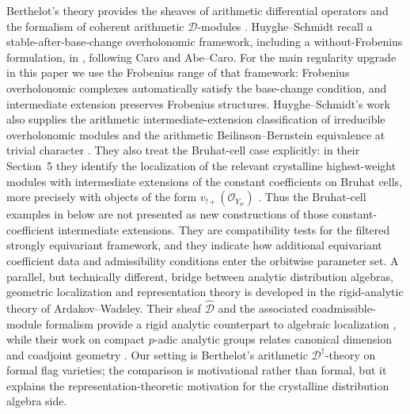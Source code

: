 \documentclass[11pt]{amsart}
\theoremstyle{plain}
\theoremstyle{definition}
\theoremstyle{remark}
\begin{document}
Berthelot's theory provides the sheaves of arithmetic differential operators
and the formalism of coherent arithmetic \(\mathscr D\)-modules
\cite[Sections 2.2 and 3]{BerthelotDModules}.  Huyghe--Schmidt recall a stable-after-base-change overholonomic framework,
including a without-Frobenius formulation, in
\cite[\S2.1, first paragraphs and Definition 2.1.3]{HuygheSchmidtIntermediate}, following Caro and Abe--Caro.
For the main regularity upgrade in this paper we use the Frobenius range of
that framework: Frobenius overholonomic complexes automatically satisfy the
base-change condition, and intermediate extension preserves Frobenius
structures.  Huyghe--Schmidt's work also supplies the
arithmetic intermediate-extension classification of irreducible overholonomic
modules and the arithmetic Beilinson--Bernstein equivalence at trivial
character \cite[Theorem 2.3.4 and Theorem 4.2.1]{HuygheSchmidtIntermediate}.
They also treat the Bruhat-cell case explicitly: in their Section~5 they
identify the localization of the relevant crystalline highest-weight modules
with intermediate extensions of the constant coefficients on Bruhat cells,
more precisely with objects of the form \(v_{!+}(\mathcal O_{Y_w})\)
\cite[Theorem 5.1.9]{HuygheSchmidtIntermediate}.  Thus the Bruhat-cell
examples in  below are not presented as new constructions
of those constant-coefficient intermediate extensions.  They are compatibility
tests for the filtered strongly equivariant framework, and they indicate how
additional equivariant coefficient data and admissibility conditions enter the
orbitwise parameter set.
A parallel, but technically different, bridge between analytic distribution
algebras, geometric localization and representation theory is developed in the
rigid-analytic theory of Ardakov--Wadsley. Their sheaf
\(\widehat{\mathcal D}\) and the associated coadmissible-module formalism
provide a rigid analytic counterpart to algebraic localization
\cite[Theorems A and B]{ArdakovWadsleyRigidD}, while their work on compact
\(p\)-adic analytic groups relates canonical dimension and coadjoint geometry
\cite[Theorem A]{ArdakovWadsleyCompactReps}. Our setting is Berthelot's
arithmetic \(\mathscr D^\dagger\)-theory on formal flag varieties; the
comparison is motivational rather than formal, but it explains the representation-theoretic motivation for the
crystalline distribution algebra side.
\end{document}

